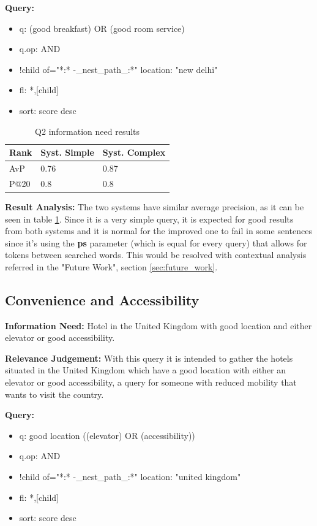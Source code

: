 \documentclass[sigconf]{acmart}
\begin{document}
\textbf{Query:}

\begin{itemize}
    \item q: (good breakfast) OR (good room service)
    \item q.op: AND
    \item {!child of="*:* -\_nest\_path\_:*"} location: "new delhi"
    \item fl: *,[child]
    \item sort: score desc
\end{itemize}

\begin{table}[h]
\caption{Q2 information need results}
\label{tab:q2}
\begin{tabular}{lll}
\toprule
Rank & Syst. Simple & Syst. Complex\\
\midrule
AvP & 0.76 & 0.87  \\
P@20 & 0.8 & 0.8 \\
\bottomrule
\end{tabular}
\end{table}

\textbf{Result Analysis:}\label{ra_q2} The two systems have similar average precision, as it can be seen in table \ref{tab:q2}. Since it is a very simple query, it is expected for good results from both systems and it is normal for the improved one to fail in some sentences since it's using the \textbf{ps} parameter (which is equal for every query) that allows for tokens between searched words. This would be resolved with contextual analysis referred in the "Future Work", section \ref{sec:future_work}.




\subsection{Convenience and Accessibility}

\textbf{Information Need:} Hotel in the United Kingdom with good location and either elevator or good accessibility.

\textbf{Relevance Judgement:} With this query it is intended to gather the hotels situated in the United Kingdom which have a good location with either an elevator or good accessibility, a query for someone with reduced mobility that wants to visit the country.

\textbf{Query:}

\begin{itemize}
    \item q: good location ((elevator) OR (accessibility))
    \item q.op: AND
    \item {!child of="*:* -\_nest\_path\_:*"} location: "united kingdom"
    \item fl: *,[child]
    \item sort: score desc
\end{itemize}
\end{document}
